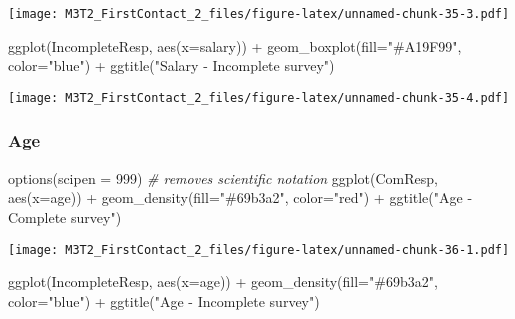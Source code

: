 \documentclass[
]{article}
\newenvironment{Shaded}{\begin{snugshade}}{\end{snugshade}}
\newcommand{\AttributeTok}[1]{\textcolor[rgb]{0.77,0.63,0.00}{#1}}
\newcommand{\CommentTok}[1]{\textcolor[rgb]{0.56,0.35,0.01}{\textit{#1}}}
\newcommand{\DecValTok}[1]{\textcolor[rgb]{0.00,0.00,0.81}{#1}}
\newcommand{\FunctionTok}[1]{\textcolor[rgb]{0.00,0.00,0.00}{#1}}
\newcommand{\NormalTok}[1]{#1}
\newcommand{\SpecialCharTok}[1]{\textcolor[rgb]{0.00,0.00,0.00}{#1}}
\newcommand{\StringTok}[1]{\textcolor[rgb]{0.31,0.60,0.02}{#1}}
\begin{document}
\texttt{[image: M3T2\_FirstContact\_2\_files/figure-latex/unnamed-chunk-35-3.pdf]}

\begin{Shaded}
\begin{Highlighting}[]
\FunctionTok{ggplot}\NormalTok{(IncompleteResp, }\FunctionTok{aes}\NormalTok{(}\AttributeTok{x=}\NormalTok{salary)) }\SpecialCharTok{+} \FunctionTok{geom\_boxplot}\NormalTok{(}\AttributeTok{fill=}\StringTok{"\#A19F99"}\NormalTok{, }\AttributeTok{color=}\StringTok{"blue"}\NormalTok{) }\SpecialCharTok{+} \FunctionTok{ggtitle}\NormalTok{(}\StringTok{"Salary {-} Incomplete survey"}\NormalTok{) }
\end{Highlighting}
\end{Shaded}

\texttt{[image: M3T2\_FirstContact\_2\_files/figure-latex/unnamed-chunk-35-4.pdf]}

\hypertarget{age-1}{%
\subsubsection{Age}\label{age-1}}

\begin{Shaded}
\begin{Highlighting}[]
\FunctionTok{options}\NormalTok{(}\AttributeTok{scipen =} \DecValTok{999}\NormalTok{) }\CommentTok{\# removes scientific notation}
\FunctionTok{ggplot}\NormalTok{(ComResp, }\FunctionTok{aes}\NormalTok{(}\AttributeTok{x=}\NormalTok{age)) }\SpecialCharTok{+}
    \FunctionTok{geom\_density}\NormalTok{(}\AttributeTok{fill=}\StringTok{"\#69b3a2"}\NormalTok{, }\AttributeTok{color=}\StringTok{"red"}\NormalTok{) }\SpecialCharTok{+} 
  \FunctionTok{ggtitle}\NormalTok{(}\StringTok{"Age {-} Complete survey"}\NormalTok{)}
\end{Highlighting}
\end{Shaded}

\texttt{[image: M3T2\_FirstContact\_2\_files/figure-latex/unnamed-chunk-36-1.pdf]}

\begin{Shaded}
\begin{Highlighting}[]
\FunctionTok{ggplot}\NormalTok{(IncompleteResp, }\FunctionTok{aes}\NormalTok{(}\AttributeTok{x=}\NormalTok{age)) }\SpecialCharTok{+}
    \FunctionTok{geom\_density}\NormalTok{(}\AttributeTok{fill=}\StringTok{"\#69b3a2"}\NormalTok{, }\AttributeTok{color=}\StringTok{"blue"}\NormalTok{) }\SpecialCharTok{+} 
  \FunctionTok{ggtitle}\NormalTok{(}\StringTok{"Age {-} Incomplete survey"}\NormalTok{)}
\end{Highlighting}
\end{Shaded}
\end{document}
